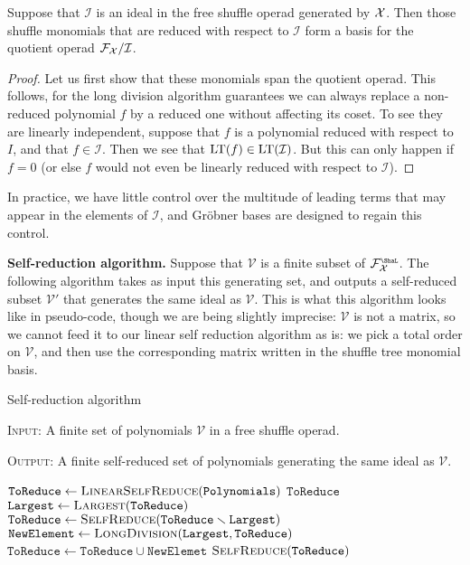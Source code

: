 \begin{proposition}
Suppose that $\mathcal I$ is an ideal in the free shuffle
operad generated by $\mathcal{X}$. Then those shuffle monomials that
are reduced with respect to $\mathcal I$ form a basis
for the quotient operad $\mathcal{F}_{\mathcal{X}} / \mathcal I$.  
\end{proposition}

\begin{proof}
Let us first show that these monomials span the quotient operad.
This follows, for the long division algorithm guarantees
we can always replace a non-reduced polynomial $f$ by a reduced
one without affecting its coset. To see they are linearly
independent, suppose that $f$ is a polynomial reduced with
respect to $I$, and that $f\in \mathcal I$. Then we see that
$\operatorname{LT}(f) \in \operatorname{LT}(\mathcal I)$. But this can only happen if
$f=0$ (or else $f$ would not even be linearly reduced with respect
to $\mathcal I$). 
\end{proof}

In practice, we
have little control over the multitude of leading terms
that may appear in the elements of $\mathcal I$,
and Gr\"obner bases are designed to regain this control. 
 
 \bigskip
 
 \textbf{Self-reduction algorithm.} Suppose that
 $\mathcal V$ is a finite subset of $\FF_\XX^\Sha$. 
 The following
 algorithm takes as input this generating set,
 and outputs a self-reduced subset $\mathcal V'$
 that generates the same ideal as $\mathcal V$. 
 This is what this algorithm looks like in pseudo-code, 
 though we are being slightly imprecise: $\mathcal V$ is
 not a matrix, so we cannot feed it to our linear self
 reduction algorithm as is: we pick a total order on
 $\mathcal V$, and then use the corresponding matrix
 written in the shuffle tree monomial basis. 
 
 \begin{algorithm}
\caption{Self-reduction algorithm}\label{algo:self-reduce}
\textsc{Input:} A finite set of polynomials $\mathcal V$ in a
free shuffle operad.

\textsc{Output:} A finite self-reduced set of polynomials 
generating the same ideal as $\mathcal V$.
\begin{adjustwidth}{1 cm}{2 cm}
\begin{algorithmic}[1]
	\State $\texttt{ToReduce} \gets \textsc{LinearSelfReduce}(\texttt{Polynomials})$
 \Return $\texttt{ToReduce}$
\Else 
\State $\texttt{Largest} 
	\gets \textsc{Largest}(\texttt{ToReduce})$
\State $\texttt{ToReduce} \gets \textsc{SelfReduce}(\texttt{ToReduce}\smallsetminus \texttt{Largest} )$
\State $\texttt{NewElement} \gets \textsc{LongDivision}(\texttt{Largest} ,\texttt{ToReduce})$
\State $\texttt{ToReduce}\gets \texttt{ToReduce}\cup \texttt{NewElemet}$
\EndIf
\State \Return $\textsc{SelfReduce}(\texttt{ToReduce})$
\EndProcedure
\end{algorithmic}
\end{adjustwidth}

\end{algorithm}

